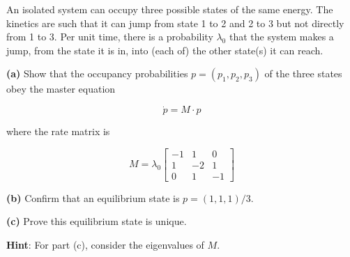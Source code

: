 \documentclass[
  letterpaper,
  enabledeprecatedfontcommands]{report}
\begin{document}
An isolated system can occupy three possible states of the same energy.
The kinetics are such that it can jump from state 1 to 2 and 2 to 3 but
not directly from 1 to 3. Per unit time, there is a probability
\(\lambda_0\) that the system makes a jump, from the state it is in,
into (each of) the other state(s) it can reach.

\textbf{(a)} Show that the occupancy probabilities
\(p = (p_1, p_2, p_3)\) of the three states obey the master equation

\[
\dot{p} = M \cdot p
\]

where the rate matrix is

\[
M = \lambda_0 \begin{bmatrix}
-1 & 1 & 0 \\
1 & -2 & 1 \\
0 & 1 & -1
\end{bmatrix}
\]

\textbf{(b)} Confirm that an equilibrium state is \(p = (1, 1, 1)/3\).

\textbf{(c)} Prove this equilibrium state is unique.

\textbf{Hint}: For part (c), consider the eigenvalues of \(M\).
\end{document}
